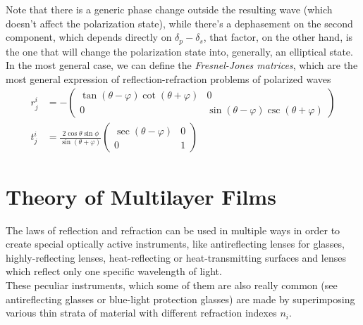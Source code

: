 \documentclass[../electromagnetism.tex]{subfiles}
\begin{document}
Note that there is a generic phase change outside the resulting wave (which doesn't affect the polarization state), while there's a dephasement on the second component, which depends directly on $\delta_p-\delta_s$, that factor, on the other hand, is the one that will change the polarization state into, generally, an elliptical state.\\
In the most general case, we can define the \textit{Fresnel-Jones matrices}, which are the most general expression of reflection-refraction problems of polarized waves
\begin{equation}
	\begin{aligned}
		r^i_j&= -\begin{pmatrix}
		\tan\left( \theta-\varphi \right)\cot\left( \theta+\varphi \right)&0\\
		0&\sin\left( \theta-\varphi \right)\csc\left( \theta+\varphi \right)
		\end{pmatrix}\\
		t^i_j&= \frac{2\cos\theta\sin\phi}{\sin\left( \theta+\varphi \right)}\begin{pmatrix}
		\sec\left( \theta-\varphi \right)&0\\
			0&1
		\end{pmatrix}
	\end{aligned}
	\label{eq:fresneljones.rjon}
\end{equation}
\section{Theory of Multilayer Films}
The laws of reflection and refraction can be used in multiple ways in order to create special optically active instruments, like antireflecting lenses for glasses, highly-reflecting lenses, heat-reflecting or heat-transmitting surfaces and lenses which reflect only one specific wavelength of light.\\
These peculiar instruments, which some of them are also really common (see antireflecting glasses or blue-light protection glasses) are made by superimposing various thin strata of material with different refraction indexes $n_i$.\\
\end{document}

